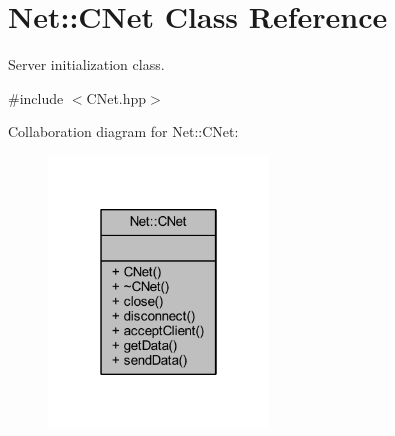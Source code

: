 \hypertarget{class_net_1_1_c_net}{}\section{Net\+:\+:C\+Net Class Reference}
\label{class_net_1_1_c_net}


Server initialization class.  




{\ttfamily \#include $<$C\+Net.\+hpp$>$}



Collaboration diagram for Net\+:\+:C\+Net\+:
\nopagebreak
\begin{figure}[H]
\begin{center}
\leavevmode
\includegraphics[width=166pt]{class_net_1_1_c_net__coll__graph}
\end{center}
\end{figure}
